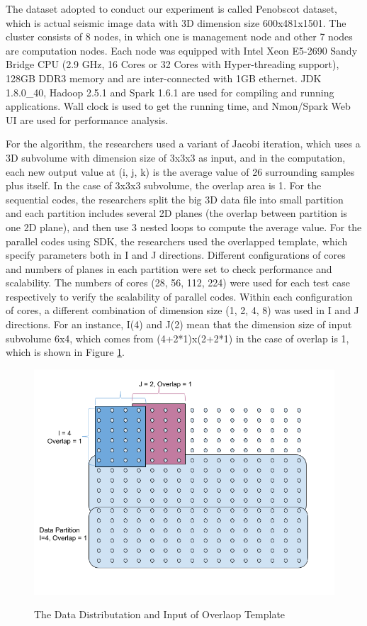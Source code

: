 The dataset adopted to conduct our experiment is called Penobscot dataset, which is actual seismic image data with 3D dimension size 600x481x1501. 
The cluster consists of 8 nodes, in which one is management node and other 7 nodes are computation nodes. Each node was equipped with Intel Xeon E5-2690 Sandy Bridge CPU (2.9 GHz, 16 Cores or 32 Cores with Hyper-threading support), 128GB DDR3 memory and are inter-connected with 1GB ethernet. 
JDK 1.8.0\_40, Hadoop 2.5.1 and Spark 1.6.1 are used for compiling and running applications. Wall clock is used to get the running time, and Nmon/Spark Web UI are used for performance analysis.

For the algorithm, the researchers used a variant of Jacobi iteration, which uses a 3D subvolume with dimension size of 3x3x3 as input, and in the computation, each new output value at (i, j, k) is the average value of 26 surrounding samples plus itself. In the case of 3x3x3 subvolume, the overlap area is 1. 
For the sequential codes, the researchers split the big 3D data file into small partition and each partition includes several 2D planes (the overlap between partition is one 2D plane), and then use 3 nested loops to compute the average value. 
For the parallel codes using SDK, the researchers used the overlapped template, which specify parameters both in I and J directions. 
Different configurations of cores and numbers of planes in each partition were set to check performance and scalability. 
The numbers of cores (28, 56, 112, 224) were used for each test case respectively to verify the scalability of parallel codes. 
Within each configuration of cores,  a different combination of dimension size (1, 2, 4, 8) was used in I and J directions. For an instance, I(4) and J(2) mean that the dimension size of input subvolume 6x4, which comes from (4+2*1)x(2+2*1) in the case of overlap is 1, which is shown in Figure \ref{StencilData}.

\begin{figure}[h]
\centering
\includegraphics[scale=0.5]{figures/StencilData.png}\\
\caption{The Data Distributation and Input of Overlaop Template}
\label{StencilData}
\end{figure}

